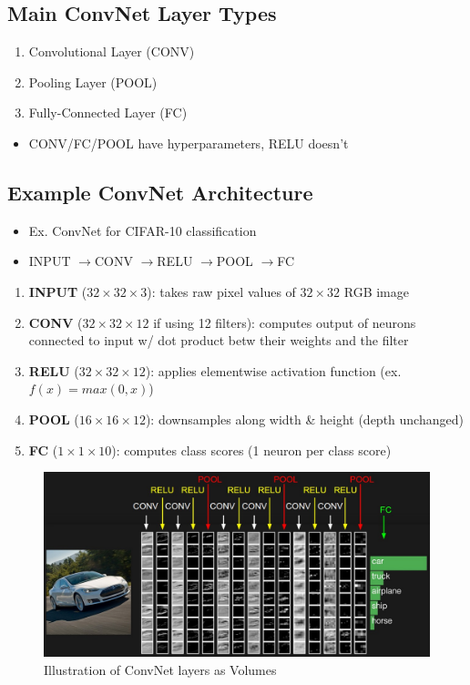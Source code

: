 \documentclass[a4paper,12pt]{article}
\newcommand{\lra}{\ensuremath{\longrightarrow{}}}
\begin{document}
\subsection{Main ConvNet Layer Types}
\begin{enumerate}
  \item Convolutional Layer (CONV)
  \item Pooling Layer (POOL)
  \item Fully-Connected Layer (FC)
\end{enumerate}
\begin{itemize}
  \item CONV/FC/POOL have hyperparameters, RELU doesn't
\end{itemize}


\subsection{Example ConvNet Architecture}
\begin{itemize}
  \item Ex. ConvNet for CIFAR-10 classification
  \item INPUT \lra CONV \lra RELU \lra POOL \lra FC
\end{itemize}
\begin{enumerate}
    \item \textbf{INPUT} ($32\times 32\times 3$): takes raw pixel values of $32\times 32$ RGB image
    \item \textbf{CONV} ($32\times 32\times 12$ if using 12 filters): computes output of neurons connected to input w/ dot product betw their weights and the filter
    \item \textbf{RELU} ($32\times 32\times 12$): applies elementwise activation function (ex. $f(x) = max(0,x)$)
    \item \textbf{POOL} ($16\times 16\times 12$): downsamples along width \& height (depth unchanged)
    \item \textbf{FC} ($1\times 1\times 10$): computes class scores (1 neuron per class score)
\end{enumerate}

\begin{figure}[th]
  \centering
  \includegraphics[width=165mm, scale=1]{images/ConvNet-Example.jpeg}
  \caption{Illustration of ConvNet layers as Volumes}
  \label{Example}
\end{figure}
\end{document}
